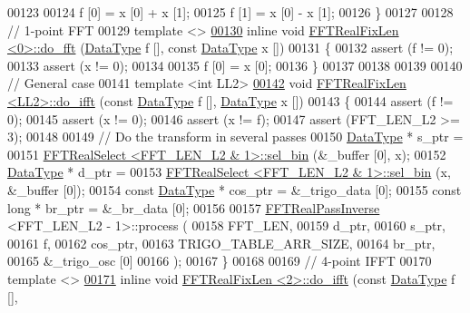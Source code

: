 \begin{DoxyCode}
00123 
00124     f [0] = x [0] + x [1];
00125     f [1] = x [0] - x [1];
00126 \}
00127 
00128 \textcolor{comment}{// 1-point FFT}
00129 \textcolor{keyword}{template} <>
\hypertarget{a00098_source_l00130}{}\hyperlink{a00011_ab4f7a74138b51d987a4da24b7328a324}{00130} \textcolor{keyword}{inline} \textcolor{keywordtype}{void} \hyperlink{a00011}{FFTRealFixLen <0>::do\_fft} (\hyperlink{a00011_a1aee47aa93a19226faec1c1bf91a6bd4}{DataType} f [], \textcolor{keyword}{const} 
      \hyperlink{a00011_a1aee47aa93a19226faec1c1bf91a6bd4}{DataType} x [])
00131 \{
00132     assert (f != 0);
00133     assert (x != 0);
00134 
00135     f [0] = x [0];
00136 \}
00137 
00138 
00139 
00140 \textcolor{comment}{// General case}
00141 \textcolor{keyword}{template} <\textcolor{keywordtype}{int} LL2>
\hypertarget{a00098_source_l00142}{}\hyperlink{a00011_a8c91704fcb63e105c7e9e31e5ab6d304}{00142} \textcolor{keywordtype}{void}    \hyperlink{a00011}{FFTRealFixLen <LL2>::do\_ifft} (\textcolor{keyword}{const} \hyperlink{a00011_a1aee47aa93a19226faec1c1bf91a6bd4}{DataType} f [], 
      \hyperlink{a00011_a1aee47aa93a19226faec1c1bf91a6bd4}{DataType} x [])
00143 \{
00144     assert (f != 0);
00145     assert (x != 0);
00146     assert (x != f);
00147     assert (FFT\_LEN\_L2 >= 3);
00148 
00149     \textcolor{comment}{// Do the transform in several passes}
00150     \hyperlink{a00011_a1aee47aa93a19226faec1c1bf91a6bd4}{DataType} *      s\_ptr =
00151         \hyperlink{a00015}{FFTRealSelect <FFT\_LEN\_L2 & 1>::sel\_bin} (&\_buffer [0], x);
00152     \hyperlink{a00011_a1aee47aa93a19226faec1c1bf91a6bd4}{DataType} *      d\_ptr =
00153         \hyperlink{a00015}{FFTRealSelect <FFT\_LEN\_L2 & 1>::sel\_bin} (x, &\_buffer [0]);
00154     \textcolor{keyword}{const} \hyperlink{a00011_a1aee47aa93a19226faec1c1bf91a6bd4}{DataType}  *   cos\_ptr = &\_trigo\_data [0];
00155     \textcolor{keyword}{const} \textcolor{keywordtype}{long} *    br\_ptr = &\_br\_data [0];
00156 
00157     \hyperlink{a00014}{FFTRealPassInverse} <FFT\_LEN\_L2 - 1>::process (
00158         FFT\_LEN,
00159         d\_ptr,
00160         s\_ptr,
00161         f,
00162         cos\_ptr,
00163         TRIGO\_TABLE\_ARR\_SIZE,
00164         br\_ptr,
00165         &\_trigo\_osc [0]
00166     );
00167 \}
00168 
00169 \textcolor{comment}{// 4-point IFFT}
00170 \textcolor{keyword}{template} <>
\hypertarget{a00098_source_l00171}{}\hyperlink{a00011_ad1f5e8624888aaf3d8414350b0298015}{00171} \textcolor{keyword}{inline} \textcolor{keywordtype}{void} \hyperlink{a00011}{FFTRealFixLen <2>::do\_ifft} (\textcolor{keyword}{const} \hyperlink{a00011_a1aee47aa93a19226faec1c1bf91a6bd4}{DataType} f [], 

\end{DoxyCode}
